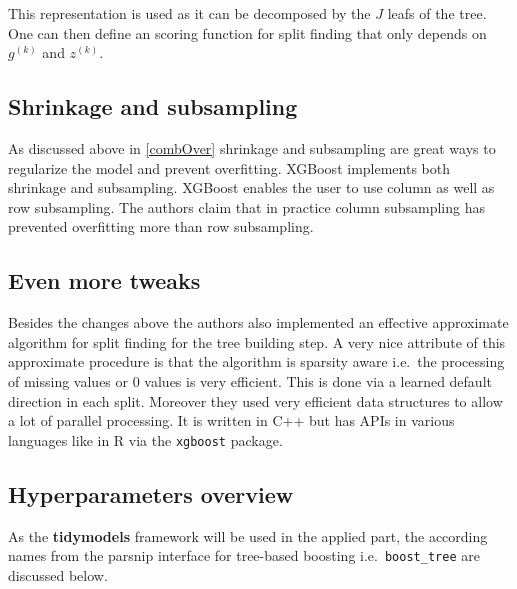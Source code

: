 \documentclass[
]{book}
\begin{document}
This representation is used as it can be decomposed by the \(J\) leafs of the tree. One can then define an scoring function for split finding that only depends on \(g^{(k)}\) and \(z^{(k)}\).

\hypertarget{shrinkage-and-subsampling}{%
\subsection{Shrinkage and subsampling}\label{shrinkage-and-subsampling}}

As discussed above in \ref{combOver} shrinkage and subsampling are great ways to regularize the model and prevent overfitting. XGBoost implements both shrinkage and subsampling. XGBoost enables the user to use column as well as row subsampling. The authors claim that in practice column subsampling has prevented overfitting more than row subsampling.\citep{xgboostPaper}

\hypertarget{even-more-tweaks}{%
\subsection{Even more tweaks}\label{even-more-tweaks}}

Besides the changes above the authors also implemented an effective approximate algorithm for split finding for the tree building step. A very nice attribute of this approximate procedure is that the algorithm is sparsity aware i.e.~the processing of missing values or 0 values is very efficient. This is done via a learned default direction in each split. Moreover they used very efficient data structures to allow a lot of parallel processing.\citep{xgboostPaper} It is written in C++ but has APIs in various languages like in R via the \texttt{xgboost} package.\citep{xgboost_package}

\hypertarget{hyperparameters-overview}{%
\subsection{Hyperparameters overview}\label{hyperparameters-overview}}

As the \textbf{tidymodels} framework will be used in the applied part, the according names from the parsnip interface for tree-based boosting i.e.~\texttt{boost\_tree} are discussed below.\citep[\citet{xgboost_package}, \citet{tidymodels}]{xgboostPaper}
\end{document}
